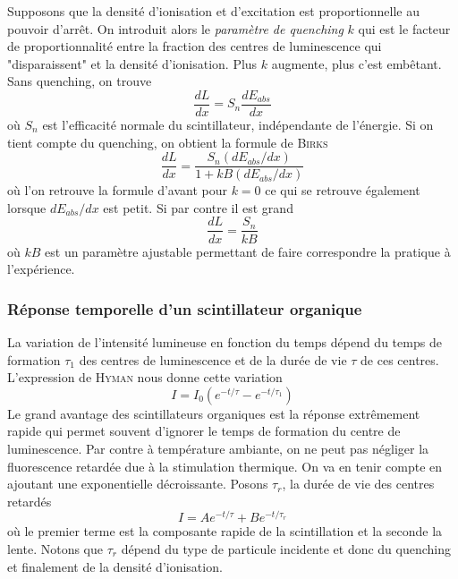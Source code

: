 Supposons que la densité d'ionisation et d'excitation est proportionnelle au pouvoir d'arrêt. On 
introduit alors le \textit{paramètre de quenching} $k$ qui est le facteur de proportionnalité entre 
la fraction des centres de luminescence qui "disparaissent" et la densité d'ionisation. Plus $k$ 
augmente, plus c'est embêtant. Sans quenching, on trouve
\begin{equation}
\frac{dL}{dx}=S_n\frac{dE_{abs}}{dx}
\end{equation}
où $S_n$ est l'efficacité normale du scintillateur, indépendante de l'énergie. Si on tient compte
du quenching, on obtient la formule de \textsc{Birks}
\begin{equation}
\frac{dL}{dx}=\frac{S_n(dE_{abs}/dx)}{1+kB(dE_{abs}/dx)}
\end{equation}
où l'on retrouve la formule d'avant pour $k=0$ ce qui se retrouve également lorsque $dE_{abs}/dx$ 
est petit. Si par contre il est grand
\begin{equation}
\frac{dL}{dx}=\frac{S_n}{kB}
\end{equation}
où $kB$ est un paramètre ajustable permettant de faire correspondre la pratique à l'expérience.

\newpage
\subsubsection{Réponse temporelle d’un scintillateur organique }%
La variation de l'intensité lumineuse en fonction du temps dépend du temps de formation $\tau_1$ des
centres de luminescence et de la durée de vie $\tau$ de ces centres. L'expression de 
\textsc{Hyman} nous donne cette variation 
\begin{equation}
I=I_0\left(e^{-t/\tau}-e^{-t/\tau_1}\right)
\end{equation}
Le grand avantage des scintillateurs organiques est la réponse extrêmement rapide qui permet souvent
d'ignorer le temps de formation du centre de luminescence. Par contre à température ambiante, on 
ne peut pas négliger la fluorescence retardée due à la stimulation thermique. On va en tenir compte
en ajoutant une exponentielle décroissante. Posons $\tau_r$, la durée de vie des centres retardés
\begin{equation}
I=Ae^{-t/\tau}+Be^{-t/\tau_r}
\end{equation}
où le premier terme est la composante rapide de la scintillation et la seconde la lente.  Notons que
$\tau_r$ dépend du type de particule incidente et donc du quenching et finalement de la densité 
d'ionisation.







